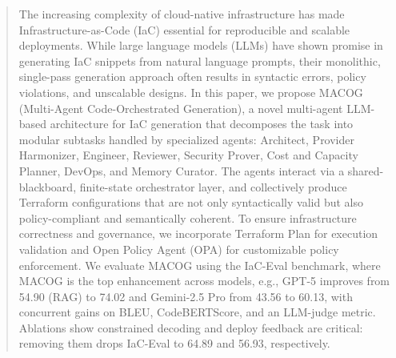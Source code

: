 \documentclass[acmsmall,screen,review,anonymous]{acmart}
\begin{document}
\begin{abstract}
  The increasing complexity of cloud-native infrastructure has made Infrastructure-as-Code (IaC) essential for reproducible and scalable deployments. While large language models (LLMs) have shown promise in generating IaC snippets from natural language prompts, their monolithic, single-pass generation approach often results in syntactic errors, policy violations, and unscalable designs. In this paper, we propose MACOG (Multi-Agent Code-Orchestrated Generation), a novel multi-agent LLM-based architecture for IaC generation that decomposes the task into modular subtasks handled by specialized agents: Architect, Provider Harmonizer, Engineer, Reviewer, Security Prover, Cost and Capacity Planner, DevOps, and Memory Curator. The agents interact via a shared-blackboard, finite-state orchestrator layer, and collectively produce Terraform configurations that are not only syntactically valid but also policy-compliant and semantically coherent. To ensure infrastructure correctness and governance, we incorporate Terraform Plan for execution validation and Open Policy Agent (OPA) for customizable policy enforcement. We evaluate MACOG using the IaC-Eval benchmark, where MACOG is the top enhancement across models, e.g., GPT-5 improves from 54.90 (RAG) to 74.02 and Gemini-2.5 Pro from 43.56 to 60.13, with concurrent gains on BLEU, CodeBERTScore, and an LLM-judge metric. Ablations show constrained decoding and deploy feedback are critical: removing them drops IaC-Eval to 64.89 and 56.93, respectively.
\end{abstract}






\end{document}
